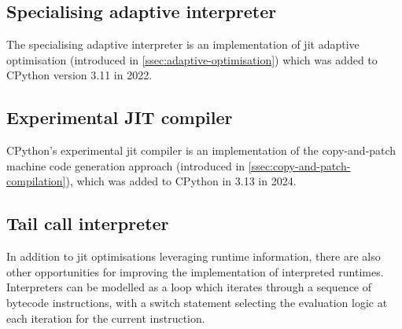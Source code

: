 \subsection{Specialising adaptive interpreter}
\label{ssec:specialising-adaptive-interpreter}


The specialising adaptive interpreter is an implementation of \ac{jit} adaptive optimisation (introduced in \autoref{ssec:adaptive-optimisation}) which was added to CPython version 3.11 in 2022.



\subsection{Experimental JIT compiler}
\label{ssec:experimental-jit-compiler}

CPython's experimental \ac{jit} compiler is an implementation of the copy-and-patch machine code generation approach (introduced in \autoref{ssec:copy-and-patch-compilation}), which was added to CPython in 3.13 in 2024.


\subsection{Tail call interpreter}
\label{ssec:tail-call-interpreter}

In addition to \ac{jit} optimisations leveraging runtime information, there are also other opportunities for improving the implementation of interpreted runtimes.
Interpreters can be modelled as a loop which iterates through a sequence of bytecode instructions, with a switch statement selecting the evaluation logic at each iteration for the current instruction.



